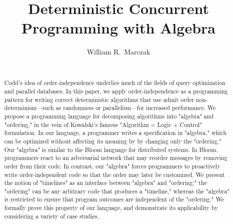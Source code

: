 \documentclass{sig-alternate}
\begin{document}
\title{Deterministic Concurrent Programming with Algebra}


%


\author{
\alignauthor William R.\ Marczak\\
\\
}

\toappear{}

\maketitle

\begin{abstract}
Codd's idea of order-independence underlies much of the fields of query
optimization and parallel databases.  In this paper, we apply
order-independence as a programming pattern for writing correct deterministic algorithms that use admit order non-determinism---such as randomness or parallelism---for increased performance.
We propose a programming language for decomposing algorithms
into "algebra" and "ordering," in the vein of Kowalski's famous "Algorithm
= Logic + Control" formulation.  In our language, a programmer writes a
specification in "algebra,"  which can be optimized without affecting its meaning by by changing only the "ordering."  Our
"algebra" is similar to the Bloom language for distributed systems.  In
Bloom, programmers react to an adversarial network that may reorder
messages by removing order from their code.  In contrast, our "algebra"
forces programmers to proactively write order-independent code so that the
order may later be customized.  We present the notion of "timelines" as an
interface between "algebra" and "ordering:" the "ordering" can be any
arbitrary code that produces a "timeline," whereas the "algebra" is
restricted to ensure that program outcomes are independent of the
"ordering."  We formally prove this property of our language, and
demonstrate its applicability by considering a variety of case studies.
\end{abstract}








%

\end{document}

